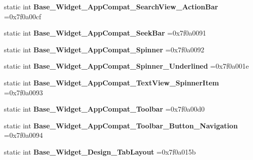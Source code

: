 \begin{DoxyCompactItemize}
static int {\bfseries Base\+\_\+\+Widget\+\_\+\+App\+Compat\+\_\+\+Search\+View\+\_\+\+Action\+Bar} =0x7f0a00cf
\item 
\mbox{\label{classandroid_1_1support_1_1v4_1_1R_1_1style_a28c491182d451514e1e230dedcd066d0}} 
static int {\bfseries Base\+\_\+\+Widget\+\_\+\+App\+Compat\+\_\+\+Seek\+Bar} =0x7f0a0091
\item 
\mbox{\label{classandroid_1_1support_1_1v4_1_1R_1_1style_ab51c0cc7b19b43722374581108a4e981}} 
static int {\bfseries Base\+\_\+\+Widget\+\_\+\+App\+Compat\+\_\+\+Spinner} =0x7f0a0092
\item 
\mbox{\label{classandroid_1_1support_1_1v4_1_1R_1_1style_a91418eec791ebb1cebc4f0ceea823ffc}} 
static int {\bfseries Base\+\_\+\+Widget\+\_\+\+App\+Compat\+\_\+\+Spinner\+\_\+\+Underlined} =0x7f0a001e
\item 
\mbox{\label{classandroid_1_1support_1_1v4_1_1R_1_1style_a8ce71a9fc82caa59e99f2bfef0a103a6}} 
static int {\bfseries Base\+\_\+\+Widget\+\_\+\+App\+Compat\+\_\+\+Text\+View\+\_\+\+Spinner\+Item} =0x7f0a0093
\item 
\mbox{\label{classandroid_1_1support_1_1v4_1_1R_1_1style_a1fc524b7505b5b40a2d92d2cf61619ac}} 
static int {\bfseries Base\+\_\+\+Widget\+\_\+\+App\+Compat\+\_\+\+Toolbar} =0x7f0a00d0
\item 
\mbox{\label{classandroid_1_1support_1_1v4_1_1R_1_1style_aef062ba9643e9eee06bed0b937ff1c64}} 
static int {\bfseries Base\+\_\+\+Widget\+\_\+\+App\+Compat\+\_\+\+Toolbar\+\_\+\+Button\+\_\+\+Navigation} =0x7f0a0094
\item 
\mbox{\label{classandroid_1_1support_1_1v4_1_1R_1_1style_a9135c5fc03146bcd9a8999e0f168a196}} 
static int {\bfseries Base\+\_\+\+Widget\+\_\+\+Design\+\_\+\+Tab\+Layout} =0x7f0a015b
\item 
\mbox{\label{classandroid_1_1support_1_1v4_1_1R_1_1style_ab930c77050d1596ce661c351931aa1fa}} 

\end{DoxyCompactItemize}
